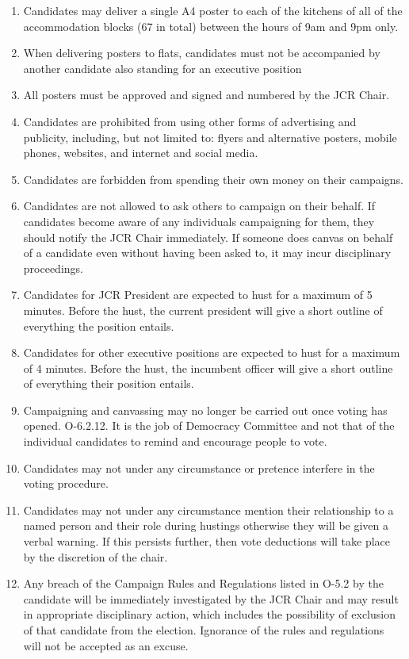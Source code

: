\begin{enumerate}
\begin{enumerate}
        \item Candidates may deliver a single A4 poster to each of the kitchens of all of the accommodation blocks (67 in total) between the hours of 9am and 9pm only. 
        \item When delivering posters to flats, candidates must not be accompanied by another candidate also standing for an executive position
        \item All posters must be approved and signed and numbered by the JCR Chair.
        \item Candidates are prohibited from using other forms of advertising and publicity, including, but
        not limited to: flyers and alternative posters, mobile phones, websites, and internet and social media.
        \item Candidates are forbidden from spending their own money on their campaigns.
        \item Candidates are not allowed to ask others to campaign on their behalf. If candidates become aware of any individuals campaigning for them, they should notify the JCR Chair immediately. If someone does canvas on behalf of a candidate even without having been asked to, it may incur disciplinary proceedings.
        \item Candidates for JCR President are expected to hust for a maximum of 5 minutes. Before the hust, the current president will give a short outline of everything the position entails.
        \item Candidates for other executive positions are expected to hust for a maximum of 4 minutes. Before the hust, the incumbent officer will give a short outline of everything their position entails.
        \item Campaigning and canvassing may no longer be carried out once voting has opened. O-6.2.12. It is the job of Democracy Committee and not that of the individual candidates to remind and encourage people to vote.
        \item Candidates may not under any circumstance or pretence interfere in the voting procedure.
        \item Candidates may not under any circumstance mention their relationship to a named person and their role during hustings otherwise they will be given a verbal warning. If this persists further, then vote deductions will take place by the discretion of the chair.
        \item Any breach of the Campaign Rules and Regulations listed in O-5.2 by the candidate will be immediately investigated by the JCR Chair and may result in appropriate disciplinary action, which includes the possibility of exclusion of that candidate from the election. Ignorance of the rules and regulations will not be accepted as an excuse.

\end{enumerate}
\end{enumerate}
